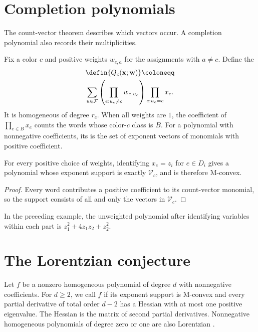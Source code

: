 \section[completionPolynomials]{Completion polynomials}

The count-vector theorem describes which vectors occur. A completion
polynomial also records their multiplicities.

Fix a color $c$ and positive weights $w_{e,a}$ for the assignments with
$a\ne c$. Define the 
\[
 \begin{gathered}
 \defin{Q_c(\mathbf x;\mathbf w)}\coloneqq\\
 \sum_{u\in\mathcal F}
 \left(\prod_{e:u_e\ne c}w_{e,u_e}\right)
 \prod_{e:u_e=c}x_e.
 \end{gathered}
\]
It is homogeneous of degree $r_c$. When all weights are $1$, the
coefficient of $\prod_{e\in B}x_e$ counts the words whose color-$c$
class is $B$.
For a polynomial with nonnegative coefficients, its 
is the set of exponent vectors of monomials with positive coefficient.

\begin{corollary}
For every positive choice of weights, identifying $x_e=z_i$ for
$e\in D_i$ gives a polynomial whose exponent support is exactly
$\mathcal V_c$, and is therefore M-convex.
\end{corollary}

\begin{proof}
Every word contributes a positive coefficient to its count-vector
monomial, so the support consists of all and only the vectors in
$\mathcal V_c$.
\end{proof}

In the preceding example, the unweighted polynomial after identifying
variables within each part is $z_1^2+4z_1z_2+z_2^2$.

\section[lorentzianConjecture]{The Lorentzian conjecture}

\begin{definition}
Let $f$ be a nonzero homogeneous polynomial of degree $d$ with nonnegative
coefficients.
For $d\geq2$, we call $f$  if its exponent support is
M-convex and every partial derivative of total order $d-2$ has a Hessian
with at most one positive eigenvalue. The Hessian is the matrix of second
partial derivatives. Nonnegative homogeneous polynomials of degree zero
or one are also Lorentzian \cite{BrandenHuh2020}.
\end{definition}

